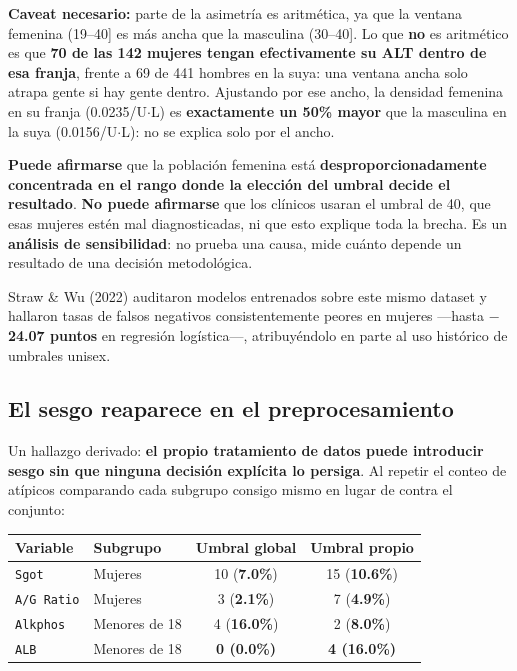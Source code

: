 \documentclass[10pt,a4paper]{article}
\begin{document}
\textbf{Caveat necesario:} parte de la asimetría es aritmética, ya que la ventana femenina (19--40] es más ancha que la masculina (30--40]. Lo que \textbf{no} es aritmético es que \textbf{70 de las 142 mujeres tengan efectivamente su ALT dentro de esa franja}, frente a 69 de 441 hombres en la suya: una ventana ancha solo atrapa gente si hay gente dentro. Ajustando por ese ancho, la densidad femenina en su franja (0.0235/U$\cdot$L) es \textbf{exactamente un 50\% mayor} que la masculina en la suya (0.0156/U$\cdot$L): no se explica solo por el ancho.

\textbf{Puede afirmarse} que la población femenina está \textbf{desproporcionadamente concentrada en el rango donde la elección del umbral decide el resultado}. \textbf{No puede afirmarse} que los clínicos usaran el umbral de 40, que esas mujeres estén mal diagnosticadas, ni que esto explique toda la brecha. Es un \textbf{análisis de sensibilidad}: no prueba una causa, mide cuánto depende un resultado de una decisión metodológica.

Straw \& Wu (2022) auditaron modelos entrenados sobre este mismo dataset y hallaron tasas de falsos negativos consistentemente peores en mujeres ---hasta \textbf{$-$24.07 puntos} en regresión logística---, atribuyéndolo en parte al uso histórico de umbrales unisex.

\subsection{El sesgo reaparece en el preprocesamiento}

Un hallazgo derivado: \textbf{el propio tratamiento de datos puede introducir sesgo sin que ninguna decisión explícita lo persiga}. Al repetir el conteo de atípicos comparando cada subgrupo consigo mismo en lugar de contra el conjunto:

\begin{table}[H]
\footnotesize
\centering
\begin{tabular}{@{}llcc@{}}
\toprule
\textbf{Variable} & \textbf{Subgrupo} & \textbf{Umbral global} & \textbf{Umbral propio} \\
\midrule
\texttt{Sgot} & Mujeres & 10 (\textbf{7.0\%}) & 15 (\textbf{10.6\%}) \\
\texttt{A/G Ratio} & Mujeres & 3 (\textbf{2.1\%}) & 7 (\textbf{4.9\%}) \\
\texttt{Alkphos} & Menores de 18 & 4 (\textbf{16.0\%}) & 2 (\textbf{8.0\%}) \\
\texttt{ALB} & Menores de 18 & \textbf{0 (0.0\%)} & \textbf{4 (16.0\%)} \\
\bottomrule
\end{tabular}
\end{table}
\end{document}
